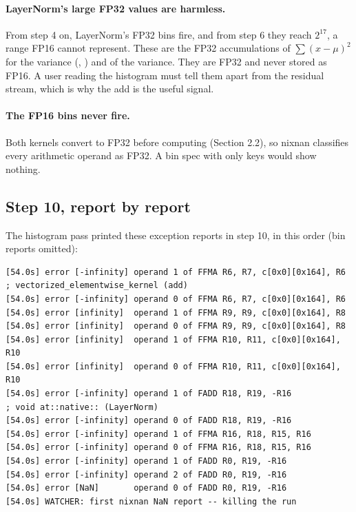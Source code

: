 \documentclass[10pt]{article}
\newcommand{\code}[1]{\texttt{\detokenize{#1}}}
\begin{document}
\paragraph{LayerNorm's large FP32 values are harmless.} From step 4 on, LayerNorm's FP32 bins fire,
and from step 6 they reach $2^{17}$, a range FP16 cannot represent. These are the FP32 accumulations
of $\sum (x-\mu)^2$ for the variance (\code{FMUL}, \code{FFMA}) and \code{MUFU.RSQ} of the variance.
They are FP32 and never stored as FP16. A user reading the histogram must tell them apart from the
residual stream, which is why the add is the useful signal.

\paragraph{The FP16 bins never fire.} Both kernels convert to FP32 before computing (Section 2.2), so
nixnan classifies every arithmetic operand as FP32. A bin spec with only \code{f16} keys would show
nothing.

\subsection{Step 10, report by report}
\label{sec:step10}

The histogram pass printed these exception reports in step 10, in this order (bin reports omitted):

\begin{lstlisting}[language={}]
[54.0s] error [-infinity] operand 1 of FFMA R6, R7, c[0x0][0x164], R6   ; vectorized_elementwise_kernel (add)
[54.0s] error [-infinity] operand 0 of FFMA R6, R7, c[0x0][0x164], R6
[54.0s] error [infinity]  operand 1 of FFMA R9, R9, c[0x0][0x164], R8
[54.0s] error [infinity]  operand 0 of FFMA R9, R9, c[0x0][0x164], R8
[54.0s] error [infinity]  operand 1 of FFMA R10, R11, c[0x0][0x164], R10
[54.0s] error [infinity]  operand 0 of FFMA R10, R11, c[0x0][0x164], R10
[54.0s] error [-infinity] operand 1 of FADD R18, R19, -R16                ; void at::native:: (LayerNorm)
[54.0s] error [-infinity] operand 0 of FADD R18, R19, -R16
[54.0s] error [-infinity] operand 1 of FFMA R16, R18, R15, R16
[54.0s] error [-infinity] operand 0 of FFMA R16, R18, R15, R16
[54.0s] error [-infinity] operand 1 of FADD R0, R19, -R16
[54.0s] error [-infinity] operand 2 of FADD R0, R19, -R16
[54.0s] error [NaN]       operand 0 of FADD R0, R19, -R16
[54.0s] WATCHER: first nixnan NaN report -- killing the run
\end{lstlisting}
\end{document}
